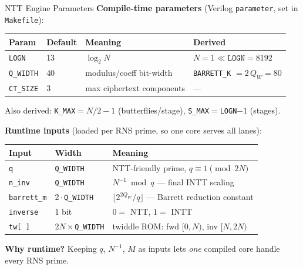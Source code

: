 \documentclass[aspectratio=169, 11pt]{beamer}
\begin{document}
\begin{frame}{NTT Engine Parameters}
\textbf{Compile-time parameters} (Verilog \texttt{parameter}, set in \texttt{Makefile}):
\begin{center}
\small
\begin{tabular}{@{}llll@{}}
\toprule
\textbf{Param} & \textbf{Default} & \textbf{Meaning} & \textbf{Derived} \\
\midrule
\texttt{LOGN}    & 13 & $\log_2 N$ & $N = 1\!\ll\!\texttt{LOGN} = 8192$ \\
\texttt{Q\_WIDTH} & 40 & modulus/coeff bit-width & \texttt{BARRETT\_K} $= 2\,Q_W = 80$ \\
\texttt{CT\_SIZE} & 3 & max ciphertext components & --- \\
\bottomrule
\end{tabular}
\end{center}
\hspace{1em}\scriptsize Also derived: \texttt{K\_MAX}$=N/2-1$ (butterflies/stage), \texttt{S\_MAX}$=$\texttt{LOGN}$-1$ (stages).

\vspace{0.5em}
\normalsize
\textbf{Runtime inputs} (loaded per RNS prime, so one core serves all lanes):
\begin{center}
\small
\begin{tabular}{@{}lll@{}}
\toprule
\textbf{Input} & \textbf{Width} & \textbf{Meaning} \\
\midrule
\texttt{q}         & \texttt{Q\_WIDTH} & NTT-friendly prime, $q \equiv 1 \pmod{2N}$ \\
\texttt{n\_inv}    & \texttt{Q\_WIDTH} & $N^{-1} \bmod q$ --- final INTT scaling \\
\texttt{barrett\_m} & $2\cdot$\texttt{Q\_WIDTH} & $\lfloor 2^{2 Q_W}/q \rfloor$ --- Barrett reduction constant \\
\texttt{inverse}   & 1 bit & $0 = $ NTT, \; $1 = $ INTT \\
\texttt{tw[\,]}      & $2N \times$\texttt{Q\_WIDTH} & twiddle ROM: fwd $[0,N)$, inv $[N,2N)$ \\
\bottomrule
\end{tabular}
\end{center}
\textbf{Why runtime?} Keeping $q$, $N^{-1}$, $M$ as inputs lets \emph{one} compiled core handle every RNS prime.
\end{frame}
\end{document}
